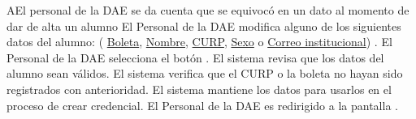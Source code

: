 \begin{UCtrayectoriaA}{A}{El personal de la DAE se da cuenta que se equivocó en un dato al momento de dar de alta un alumno }
    \UCpaso[\UCactor] El Personal de la DAE modifica alguno de los siguientes datos del alumno: ( \hyperlink{Alumno.Boleta}{Boleta}, \hyperlink{Alumno.Nombre}{Nombre}, \hyperlink{Alumno.CURP}{CURP}, \hyperlink{Alumno.Sexo}{Sexo} o \hyperlink{Alumno.Correo institucional}{Correo institucional}) .
    \UCpaso[\UCactor] El Personal de la DAE selecciona el botón .
    \UCpaso El sistema revisa que los datos del alumno sean válidos.
    \UCpaso El sistema verifica que el CURP o la boleta no hayan sido registrados con anterioridad.
    \UCpaso El sistema mantiene los datos para usarlos en el proceso de crear credencial.
    \UCpaso[\UCactor] El Personal de la DAE es redirigido a la pantalla .
\end{UCtrayectoriaA}


